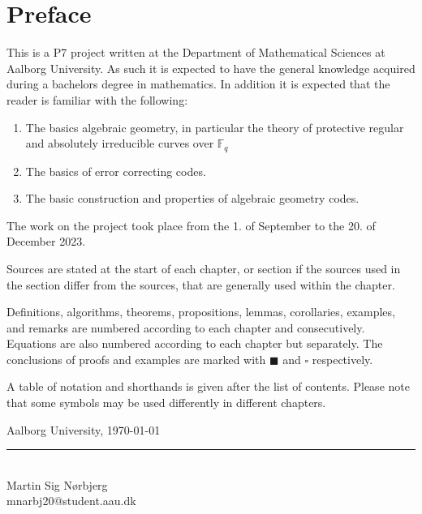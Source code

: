 \chapter*{Preface}

This is a P7 project written at the Department of Mathematical Sciences at Aalborg University.
As such it is expected to have the general knowledge acquired during a bachelors degree in mathematics. In addition it is expected that the reader is familiar with the following:
\begin{enumerate}
  \item The basics algebraic geometry, in particular the theory of protective regular and absolutely irreducible curves over $\mathbb{F}_q$
  \item The basics of error correcting codes.
  \item The basic construction and properties of algebraic geometry codes.
\end{enumerate}


The work on the project took place from the 1. of September to the 20. of December 2023.

Sources are stated at the start of each chapter, or section if the sources used in the section differ from the sources, that are generally used within the chapter.

Definitions, algorithms, theorems, propositions, lemmas, corollaries, examples, and remarks are numbered according to each chapter and consecutively.
Equations are also numbered according to each chapter but separately. %
The conclusions of proofs and examples are marked with $\blacksquare$ and $\square$ respectively.

A table of notation and shorthands is given after the list of contents.
Please note that some symbols may be used differently in different chapters.


\vspace{\baselineskip}\hfill Aalborg University, \today
\vfill\noindent

\begin{minipage}[H]{\textwidth}
 \centering
 \rule{\textwidth / 2}{1pt}\\
  Martin Sig Nørbjerg\\
 {\footnotesize mnarbj20@student.aau.dk}
\end{minipage}
\hfill
